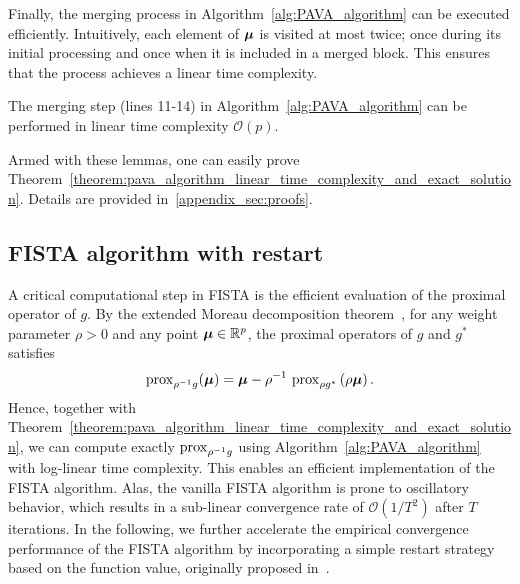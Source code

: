 Finally, the merging process in Algorithm~\ref{alg:PAVA_algorithm} can be executed efficiently. Intuitively, each element of $\bm{\mu}$ is visited at most twice; once during its initial processing and once when it is included in a merged block. This ensures that the process achieves a linear time complexity.

\begin{lemma}
    \label{lemma:PAVA_merging_linear_time_complexity}
    The merging step (lines 11-14) in Algorithm~\ref{alg:PAVA_algorithm} can be performed in linear time complexity $\mathcal O(p)$.
\end{lemma}

Armed with these lemmas, one can easily prove Theorem~\ref{theorem:pava_algorithm_linear_time_complexity_and_exact_solution}. Details are provided in~\ref{appendix_sec:proofs}.

\vspace{-2mm}
\subsection{FISTA algorithm with restart}
A critical computational step in FISTA is the efficient evaluation of the proximal operator of $g$. By the extended Moreau decomposition theorem~\citep[Theorem~6.45]{beck2017first}, for any weight parameter $\rho > 0$ and any point $\bm{\mu} \in \mathbb{R}^p$, the proximal operators of $g$ and $g^*$ satisfies
\begin{align}
    \label{eq:Moreaus_identity}
    \operatorname{prox}_{\rho^{-1} g}(\bm{\mu}) = \bm{\mu} - \rho^{-1} \, \operatorname{prox}_{\rho g^*} \left( \rho \bm{\mu} \right).
\end{align}
Hence, together with Theorem~\ref{theorem:pava_algorithm_linear_time_complexity_and_exact_solution}, we can compute exactly $\operatorname{prox}_{\rho^{-1} g}$ using Algorithm~\ref{alg:PAVA_algorithm} with log-linear time complexity. This enables an efficient implementation of the FISTA algorithm. 
Alas, the vanilla FISTA algorithm is prone to oscillatory behavior, which results in a sub-linear convergence rate of $\mathcal O(1/T^2)$ after $T$ iterations. 
In the following, we further accelerate the empirical convergence performance of the FISTA algorithm by incorporating a simple restart strategy based on the function value, originally proposed in~\citep{o2015adaptive}.

